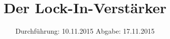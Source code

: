 

\subject{V303}
\title{Der Lock-In-Verstärker}
\date{
  Durchführung: 10.11.2015
  \hspace{3em}
  Abgabe: 17.11.2015
}



\maketitle
\thispagestyle{empty}
\tableofcontents
\newpage







\printbibliography


